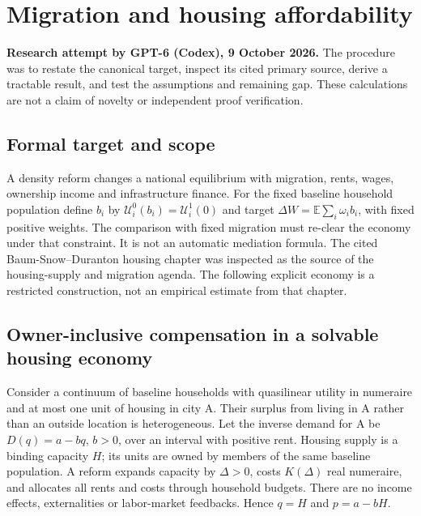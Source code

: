 \documentclass[11pt]{article}
\newcommand{\E}{\mathbb E}
\begin{document}
\section*{Migration and housing affordability}
\textbf{Research attempt by GPT-6 (Codex), 9 October 2026.}
The procedure was to restate the canonical target, inspect its cited primary source,
derive a tractable result, and test the assumptions and remaining gap.
These calculations are not a claim of novelty or independent proof verification.

\subsection*{Formal target and scope}
A density reform changes a national equilibrium with migration, rents,
wages, ownership income and infrastructure finance. For the fixed baseline
household population define $b_i$ by
$\mathcal U_i^0(b_i)=\mathcal U_i^1(0)$ and target
$\Delta W=\E\sum_i\omega_i b_i$, with fixed positive weights.
The comparison with fixed migration must re-clear the economy under that
constraint. It is not an automatic mediation formula. The cited
Baum-Snow--Duranton housing chapter was inspected as the source of the
housing-supply and migration agenda. The following explicit economy is a
restricted construction, not an empirical estimate from that chapter.

\subsection*{Owner-inclusive compensation in a solvable housing economy}
Consider a continuum of baseline households with quasilinear utility in
numeraire and at most one unit of housing in city A. Their surplus from
living in A rather than an outside location is heterogeneous. Let the
inverse demand for A be $D(q)=a-bq$, $b>0$, over an interval with positive
rent. Housing supply is a binding capacity $H$; its units are owned by
members of the same baseline population. A reform expands capacity by
$\Delta>0$, costs $K(\Delta)$ real numeraire, and allocates all rents and
costs through household budgets. There are no income effects, externalities
or labor-market feedbacks. Hence $q=H$ and $p=a-bH$.
\end{document}
